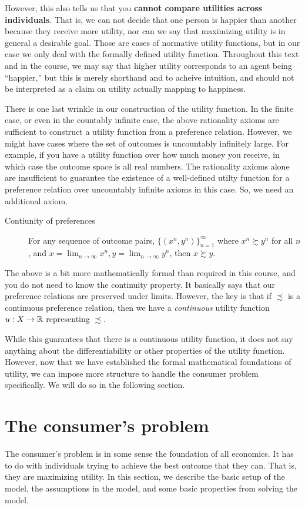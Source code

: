 However, this also tells us that you \textbf{cannot compare utilities across individuals}. That is, we can not decide that one person is happier than another because they receive more utility, nor can we say that maximizing utility is in general a desirable goal. Those are cases of normative utility functions, but in our case we only deal with the formally defined utility function. Throughout this text and in the course, we may say that higher utility corresponds to an agent being ``happier,'' but this is merely shorthand and to acheive intuition, and should not be interpreted as a claim on utility actually mapping to happiness. 

There is one last wrinkle in our construction of the utility function. In the finite case, or even in the countably infinite case, the above rationality axioms are sufficient to construct a utility function from a preference relation. However, we might have cases where the set of outcomes is uncountably infinitely large. For example, if you have a utility function over how much money you receive, in which case the outcome space is all real numbers. The rationality axioms alone are insufficient to guarantee the existence of a well-defined utilty function for a preference relation over uncountably infinite axioms in this case. So, we need an additional axiom.
\begin{description}
    \item[Contiunity of preferences] For any sequence of outcome pairs, $\{(x^n, y^n)\}_{n = 1}^\infty$ where $x^n \succsim y^n$ for all $n$, and $x = \lim_{n \to \infty} x^n, y = \lim_{n \to \infty} y^n$, then $x \succsim y$. 
\end{description}
The above is a bit more mathematically formal than required in this course, and you do not need to know the continuity property. It basically says that our preference relations are preserved under limits. However, the key is that if $\precsim$ is a continuous preference relation, then we have a \emph{continuous} utility function $u: X \to \mathbb{R}$ representing $\precsim$. 

While this guarantees that there is a continuous utility function, it does not say anything about the differentiability or other properties of the utility function. However, now that we have established the formal mathematical foundations of utility, we can impose more structure to handle the consumer problem specifically. We will do so in the following section.

\section{The consumer's problem}
The consumer's problem is in some sense the foundation of all economics. It has to do with individuals trying to achieve the best outcome that they can. That is, they are maximizing utility. In this section, we describe the basic setup of the model, the assumptions in the model, and some basic properties from solving the model.

